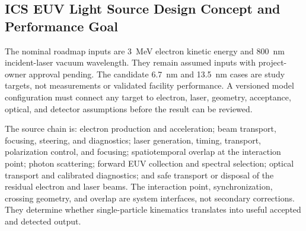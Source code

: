 \subsection{ICS EUV Light Source Design Concept and Performance Goal}

The nominal roadmap inputs are 3~MeV electron kinetic energy and 800~nm
incident-laser vacuum wavelength. They remain assumed inputs with project-owner
approval pending. The candidate 6.7~nm and 13.5~nm cases are study targets, not
measurements or validated facility performance. A versioned model configuration
must connect any target to electron, laser, geometry, acceptance, optical, and
detector assumptions before the result can be reviewed.

The source chain is: electron production and acceleration; beam transport,
focusing, steering, and diagnostics; laser generation, timing, transport,
polarization control, and focusing; spatiotemporal overlap at the interaction
point; photon scattering; forward EUV collection and spectral selection;
optical transport and calibrated diagnostics; and safe transport or disposal of
the residual electron and laser beams. The interaction point, synchronization,
crossing geometry, and overlap are system interfaces, not secondary corrections.
They determine whether single-particle kinematics translates into useful
accepted and detected output.

\blankline
\blankline
